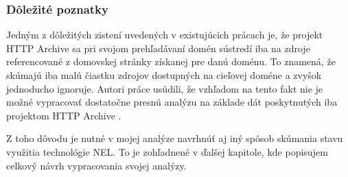 \subsubsection{Dôležité poznatky}

Jedným z dôležitých zistení uvedených v existujúcich prácach je, že projekt HTTP Archive sa pri svojom prehľadávaní domén sústredí iba na zdroje referencované z domovskej stránky získanej pre danú doménu.
To znamená, že skúmajú iba malú čiastku zdrojov dostupných na cieľovej doméne a zvyšok jednoducho ignoruje.
Autori práce usúdili, že vzhľadom na tento fakt nie je možné vypracovať dostatočne presnú analýzu na základe dát poskytnutých iba projektom HTTP Archive \cite{nel-http-archive}.

Z toho dôvodu je nutné v mojej analýze navrhnúť aj iný spôsob skúmania stavu využitia technológie NEL.
To je zohľadnené v ďalšej kapitole, kde popisujem celkový návrh vypracovania svojej analýzy.
